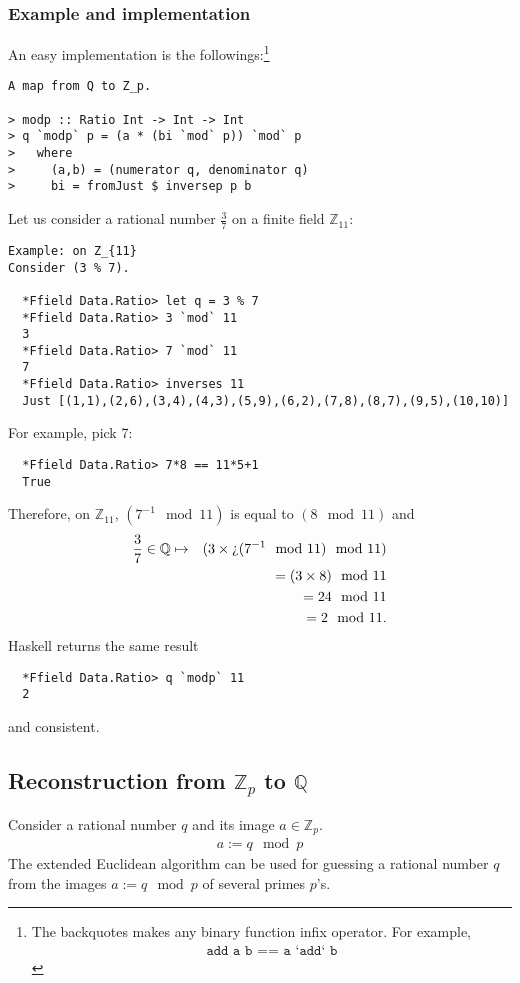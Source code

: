 \documentclass[11pt]{book}
\begin{document}
\subsubsection{Example and implementation}
An easy implementation is the followings:\footnote{
The backquotes makes any binary function infix operator.
For example,
\begin{eqnarray}
\texttt{add a b == a `add` b}
\end{eqnarray}
}
\begin{verbatim}
A map from Q to Z_p.

> modp :: Ratio Int -> Int -> Int
> q `modp` p = (a * (bi `mod` p)) `mod` p
>   where
>     (a,b) = (numerator q, denominator q)
>     bi = fromJust $ inversep p b
\end{verbatim}
Let us consider a rational number $\frac{3}{7}$ on a finite field $\mathbb{Z}_{11}$:
\begin{verbatim}
Example: on Z_{11}
Consider (3 % 7).

  *Ffield Data.Ratio> let q = 3 % 7
  *Ffield Data.Ratio> 3 `mod` 11
  3
  *Ffield Data.Ratio> 7 `mod` 11
  7
  *Ffield Data.Ratio> inverses 11
  Just [(1,1),(2,6),(3,4),(4,3),(5,9),(6,2),(7,8),(8,7),(9,5),(10,10)]
\end{verbatim}
For example, pick 7:
\begin{verbatim}  
  *Ffield Data.Ratio> 7*8 == 11*5+1
  True
\end{verbatim}
Therefore, on $\mathbb{Z}_{11}$, $(7^{-1} \mod 11)$ is equal to $(8 \mod 11)$ and
\begin{eqnarray}
\frac{3}{7} \in \mathbb{Q} &\mapsto& (3 \times \text{\textquestiondown}(7^{-1} \mod 11) \mod 11) \\
&&= (3 \times 8) \mod 11 \\
&&= 24 \mod 11 \\
&&= 2 \mod 11.
\end{eqnarray}
Haskell returns the same result
\begin{verbatim}  
  *Ffield Data.Ratio> q `modp` 11
  2
\end{verbatim}
and consistent.

\subsection{Reconstruction from $\mathbb{Z}_p$ to $\mathbb{Q}$}
Consider a rational number $q$ and its image $a \in \mathbb{Z}_p$.
\begin{eqnarray}
a := q \mod p
\end{eqnarray}
The extended Euclidean algorithm can be used for guessing a rational number $q$ from the images $a := q \mod p$ of several primes $p$'s.
\end{document}
